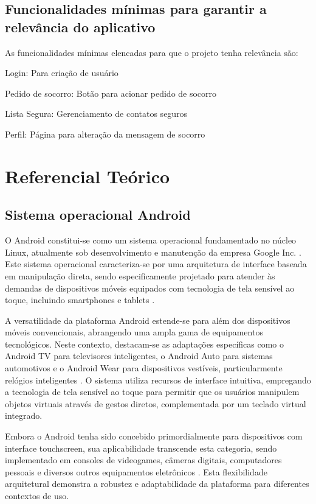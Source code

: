 \documentclass[
	12pt,				    %
	openright,			    %
	oneside,			    %
	a4paper,			    %
    sumario=tradicional,    %
	english,			    %
	brazil,				    %
	]{abntex2}              %
\begin{document}
\section{Funcionalidades mínimas para garantir a relevância do aplicativo}
As funcionalidades mínimas elencadas para que o projeto tenha relevância são:
\begin{alineas}
  \item Login: Para criação de usuário
  \item Pedido de socorro: Botão para acionar pedido de socorro
  \item Lista Segura: Gerenciamento de contatos seguros
  \item Perfil: Página para alteração da mensagem de socorro

\end{alineas}

\chapter{Referencial Teórico}\label{sec:RefTeorico}
\section{Sistema operacional Android}

O Android constitui-se como um sistema operacional fundamentado no núcleo Linux, atualmente sob desenvolvimento e manutenção da empresa Google Inc. \cite{google2023}. Este sistema operacional caracteriza-se por uma arquitetura de interface baseada em manipulação direta, sendo especificamente projetado para atender às demandas de dispositivos móveis equipados com tecnologia de tela sensível ao toque, incluindo smartphones e tablets \cite{burnette2021}.

A versatilidade da plataforma Android estende-se para além dos dispositivos móveis convencionais, abrangendo uma ampla gama de equipamentos tecnológicos. Neste contexto, destacam-se as adaptações específicas como o Android TV para televisores inteligentes, o Android Auto para sistemas automotivos e o Android Wear para dispositivos vestíveis, particularmente relógios inteligentes \cite{ableson2022}. O sistema utiliza recursos de interface intuitiva, empregando a tecnologia de tela sensível ao toque para permitir que os usuários manipulem objetos virtuais através de gestos diretos, complementada por um teclado virtual integrado.

Embora o Android tenha sido concebido primordialmente para dispositivos com interface touchscreen, sua aplicabilidade transcende esta categoria, sendo implementado em consoles de videogames, câmeras digitais, computadores pessoais e diversos outros equipamentos eletrônicos \cite{murphy2023}. Esta flexibilidade arquitetural demonstra a robustez e adaptabilidade da plataforma para diferentes contextos de uso.
\end{document}
